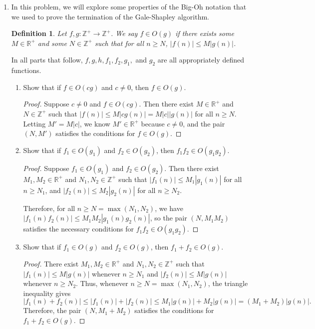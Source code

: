 \documentclass[10pt]{article}
\newcommand{\Z}{\mathbb{Z}}
\newcommand{\R}{\mathbb{R}}
\newtheorem*{Def}{Definition}
\begin{document}
\begin{enumerate}
\item In this problem, we will explore some properties of the Big-Oh notation that we used to prove the termination of the Gale-Shapley algorithm.
\begin{Def}
Let $f,g: \Z^+ \rightarrow \Z^+$.  We say $f \in O(g)$ if there exists some $M \in \R^+$ and some $N \in \Z^+$ such that for all $n \geq N$, $|f(n)| \leq M|g(n)|$.
\end{Def}

\noindent In all parts that follow, $f,g,h,f_1,f_2,g_1,$ and $g_2$ are all appropriately defined functions.
\begin{enumerate}
\item Show that if $f \in O(cg)$ and $c \neq 0$, then $f \in O(g)$.

\begin{proof}
Suppose $c \neq 0$ and $f \in O(cg)$.  Then there exist $M \in \R^+$ and $N \in \Z^+$ such that $|f(n)| \leq M|cg(n)| = M|c||g(n)|$ for all $n \geq N$.  Letting $M' = M |c|$, we know $M' \in \R^+$ because $c \neq 0$, and the pair $(N, M')$ satisfies the conditions for $f \in O(g)$.
\end{proof}

\item Show that if $f_1 \in O(g_1)$ and $f_2 \in O(g_2)$, then $f_1f_2 \in O(g_1g_2)$.

\begin{proof}
Suppose $f_1 \in O(g_1)$ and $f_2 \in O(g_2)$.  Then there exist $M_1, M_2 \in \R^+$ and $N_1, N_2 \in \Z^+$ such that $|f_1(n)| \leq M_1 |g_1(n)|$ for all $n \geq N_1$, and $|f_2(n)| \leq M_2 |g_2(n)|$ for all $n \geq N_2$.

Therefore, for all $n \geq N = \max (N_1, N_2)$, we have $|f_1(n)f_2(n)| \leq M_1M_2 |g_1(n)g_2(n)|$, so the pair $(N,M_1M_2)$ satisfies the necessary conditions for $f_1 f_2 \in O(g_1 g_2)$.
\end{proof}

\item Show that if $f_1 \in O(g)$ and $f_2 \in O(g)$, then $f_1 + f_2 \in O(g)$.

\begin{proof}
There exist $M_1,M_2 \in \R^+$ and $N_1,N_2 \in \Z^+$ such that $|f_1(n)| \leq M|g(n)|$ whenever $n \geq N_1$ and $|f_2(n)| \leq M|g(n)|$ whenever $n \geq N_2$.  Thus, whenever $n \geq N = \max(N_1,N_2)$, the triangle inequality gives
$$
|f_1(n) + f_2(n)| \leq |f_1(n)| + |f_2(n)| \leq M_1|g(n)| + M_2|g(n)| = (M_1 + M_2)|g(n)|.
$$
Therefore, the pair $(N, M_1 + M_2)$ satisfies the conditions for $f_1 + f_2 \in O(g)$.
\end{proof}
\end{enumerate}


\end{enumerate}
\end{document}
